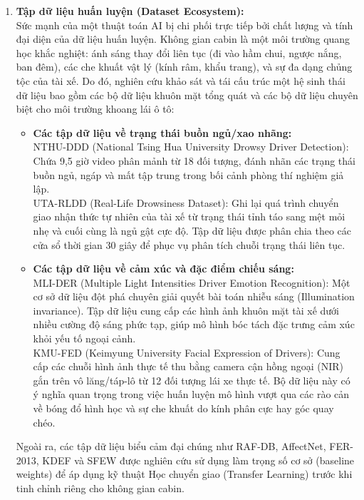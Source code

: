 \documentclass[../DoAn.tex]{subfiles}
\begin{document}
\begin{enumerate}
    \item \textbf{Tập dữ liệu huấn luyện (Dataset Ecosystem):}\\
    Sức mạnh của một thuật toán AI bị chi phối trực tiếp bởi chất lượng và tính đại diện của dữ liệu huấn luyện. Không gian cabin là một môi trường quang học khắc nghiệt: ánh sáng thay đổi liên tục (đi vào hầm chui, ngược nắng, ban đêm), các che khuất vật lý (kính râm, khẩu trang), và sự đa dạng chủng tộc của tài xế. Do đó, nghiên cứu khảo sát và tái cấu trúc một hệ sinh thái dữ liệu bao gồm các bộ dữ liệu khuôn mặt tổng quát và các bộ dữ liệu chuyên biệt cho môi trường khoang lái ô tô:
    \begin{itemize}
        \item \textbf{Các tập dữ liệu về trạng thái buồn ngủ/xao nhãng:}\\
        NTHU-DDD (National Tsing Hua University Drowsy Driver Detection): Chứa 9,5 giờ video phân mảnh từ 18 đối tượng, đánh nhãn các trạng thái buồn ngủ, ngáp và mất tập trung trong bối cảnh phòng thí nghiệm giả lập.\\
        UTA-RLDD (Real-Life Drowsiness Dataset): Ghi lại quá trình chuyển giao nhận thức tự nhiên của tài xế từ trạng thái tỉnh táo sang mệt mỏi nhẹ và cuối cùng là ngủ gật cực độ. Tập dữ liệu được phân chia theo các cửa sổ thời gian 30 giây để phục vụ phân tích chuỗi trạng thái liên tục.
        
        \item \textbf{Các tập dữ liệu về cảm xúc và đặc điểm chiếu sáng:}\\
        MLI-DER (Multiple Light Intensities Driver Emotion Recognition): Một cơ sở dữ liệu đột phá chuyên giải quyết bài toán nhiễu sáng (Illumination invariance). Tập dữ liệu cung cấp các hình ảnh khuôn mặt tài xế dưới nhiều cường độ sáng phức tạp, giúp mô hình bóc tách đặc trưng cảm xúc khỏi yếu tố ngoại cảnh.\\
        KMU-FED (Keimyung University Facial Expression of Drivers): Cung cấp các chuỗi hình ảnh thực tế thu bằng camera cận hồng ngoại (NIR) gắn trên vô lăng/táp-lô từ 12 đối tượng lái xe thực tế. Bộ dữ liệu này có ý nghĩa quan trọng trong việc huấn luyện mô hình vượt qua các rào cản về bóng đổ hình học và sự che khuất do kính phân cực hay góc quay chéo.
    \end{itemize}
    Ngoài ra, các tập dữ liệu biểu cảm đại chúng như RAF-DB, AffectNet, FER-2013, KDEF và SFEW được nghiên cứu sử dụng làm trọng số cơ sở (baseline weights) để áp dụng kỹ thuật Học chuyển giao (Transfer Learning) trước khi tinh chỉnh riêng cho không gian cabin.
\end{enumerate}
\end{document}
